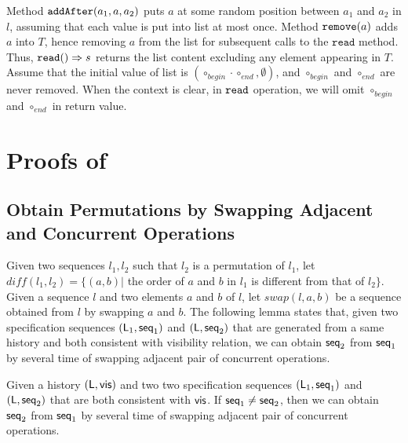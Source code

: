 Method $\alabelshort[\mathtt{addAfter}]{a_1,a,a_2}$ puts $a$ at some random position between $a_1$ and $a_2$ in $l$, assuming that each value is put into list at most once. Method $\alabelshort[\mathtt{remove}]{a}$ adds $a$ into $T$, hence removing $a$ from the list for subsequent calls to the $\mathtt{read}$ method. Thus, $\alabellong[\mathtt{read}]{}{s}{}$ returns the list content excluding any element appearing in $T$. Assume that the initial value of list is $(\circ_{begin} \cdot \circ_{end},\emptyset)$, and $\circ_{begin}$ and $\circ_{end}$ are never removed. When the context is clear, in $\ensuremath{\tt read}$ operation, we will omit $\circ_{begin}$ and $\circ_{end}$ in return value.
























\section{Proofs of \crdtimp}
\label{sec:appendix proofs of crdt implementations}



\subsection{Obtain Permutations by Swapping Adjacent and Concurrent Operations}
\label{subsec:obtain permutations by swapping adjacent and concurrent operations}

Given two sequences $l_1,l_2$  such that $l_2$ is a permutation of $l_1$, let $\mathit{diff}(l_1,l_2) = \{ (a,b) \vert$ the order of $a$ and $b$ in $l_1$ is different from that of $l_2 \}$. Given a sequence $l$ and two elements $a$ and $b$ of $l$, let $\mathit{swap}(l,a,b)$ be a sequence obtained from $l$ by swapping $a$ and $b$. The following lemma states that, given two specification sequences $(\alabelset_1, \aseqord_1)$ and $(\alabelset, \aseqord_2)$ that are generated from a same history and both consistent with visibility relation, we can obtain $\aseqord_2$ from $\aseqord_1$ by several time of swapping adjacent pair of concurrent operations.

\begin{lemma}
\label{lemma:given two sequence consistent with visibility order, one can be obtained from the other}
Given a history $(\alabelset,\avisord)$ and two two specification sequences $(\alabelset_1, \aseqord_1)$ and $(\alabelset, \aseqord_2)$ that are both consistent with $\avisord$. If $\aseqord_1 \neq \aseqord_2$, then we can obtain $\aseqord_2$ from $\aseqord_1$ by several time of swapping adjacent pair of concurrent operations.
\end{lemma}

